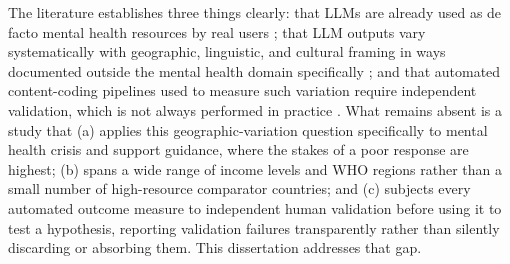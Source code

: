 The literature establishes three things clearly: that LLMs are already used as de facto mental health resources by real users \citep{rousmaniere2025mentalhealth, saha2025linguistic}; that LLM outputs vary systematically with geographic, linguistic, and cultural framing in ways documented outside the mental health domain specifically \citep{decoupes2025geographical, lyu2024regional, jin2024english}; and that automated content-coding pipelines used to measure such variation require independent validation, which is not always performed in practice \citep{dai2023llm, depaoli2024thematic}. What remains absent is a study that (a) applies this geographic-variation question specifically to mental health crisis and support guidance, where the stakes of a poor response are highest; (b) spans a wide range of income levels and WHO regions rather than a small number of high-resource comparator countries; and (c) subjects every automated outcome measure to independent human validation before using it to test a hypothesis, reporting validation failures transparently rather than silently discarding or absorbing them. This dissertation addresses that gap.
